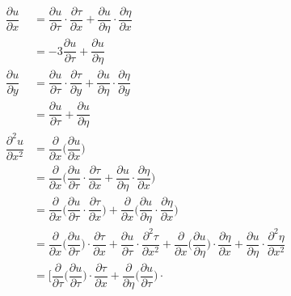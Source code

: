 \newpage
\begin{align*}
    \dfrac{\partial u}{\partial x} &= \dfrac{\partial u}{\partial \tau} \cdot \dfrac{\partial \tau}{\partial x} + %
    \dfrac{\partial u}{\partial \eta} \cdot \dfrac{\partial \eta}{\partial x} \\
                                   &=- 3\dfrac{\partial u}{\partial \tau} + \dfrac{\partial u}{\partial \eta} \\
    \dfrac{\partial u}{\partial y} &= \dfrac{\partial u}{\partial \tau} \cdot \dfrac{\partial \tau}{\partial y} + %
    \dfrac{\partial u}{\partial \eta} \cdot \dfrac{\partial \eta}{\partial y} \\
                                   &=\dfrac{\partial u}{\partial \tau} + \dfrac{\partial u}{\partial \eta} \\
    \dfrac{\partial^2 u}{\partial x^2} &= \dfrac{\partial}{\partial x} \Big( \dfrac{\partial u}{\partial x} \Big)  \\
                                       &= \dfrac{\partial}{\partial x} \Big( \dfrac{\partial u}{\partial \tau} \cdot %
                                       \dfrac{\partial \tau}{\partial x} + \dfrac{\partial u}{\partial \eta} \cdot \dfrac{\partial \eta}{\partial x} \Big) \\
                                       &= \dfrac{\partial}{\partial x} \Big( \dfrac{\partial u}{\partial \tau} \cdot \dfrac{\partial \tau}{\partial x}\Big) + %
                                       \dfrac{\partial}{\partial x} \Big( \dfrac{\partial u}{\partial \eta} \cdot \dfrac{\partial \eta}{\partial x} \Big) \\
                                       &= \dfrac{\partial}{\partial x} \Big( \dfrac{\partial u}{\partial \tau} \Big) \cdot %
                                       \dfrac{\partial \tau}{\partial x} + \dfrac{\partial u}{\partial \tau} \cdot %
                                       \dfrac{\partial^2 \tau}{\partial x^2} + \dfrac{\partial}{\partial x} \Big( \dfrac{\partial u}{\partial \eta} \Big) \cdot %
                                       \dfrac{\partial \eta}{\partial x} + \dfrac{\partial u}{\partial \eta} \cdot
                                       \dfrac{\partial^2 \eta}{\partial x^2} \\
                                       &= \Big[ \dfrac{\partial}{\partial \tau} \Big(\dfrac{\partial u}{\partial \tau}\Big) \cdot %
                                           \dfrac{\partial \tau}{\partial x} + \dfrac{\partial}{\partial \eta} \Big(\dfrac{\partial u}{\partial \tau}\Big) \cdot %

\end{align*}
